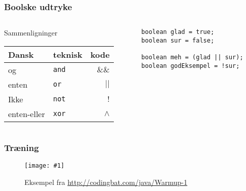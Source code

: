\documentclass{beamer}
\newcommand{\FIG}[2]{
\begin{figure}[]
  \centering
  \texttt{[image: \#1]}
  \caption{#2}
  \label{fig:#1}
\end{figure}
}
\begin{document}
\begin{frame}[fragile]
  \frametitle{Boolske udtryke}
  \begin{columns}
    \begin{column}{0.5\textwidth}
      \begin{block}{Sammenligninger}
          \begin{table}[h]
            \centering
            \begin{tabular}{llr}
              Dansk & teknisk & kode \\
              \hline
              og & \texttt{and} & $\&\&$ \\
              enten & \texttt{or} & $|| $\\
              Ikke & \texttt{not} & $!$\\
              enten-eller & \texttt{xor} & $\wedge$\\
            \end{tabular}
          \end{table}
      \end{block}
    \end{column}
    \begin{column}{0.5\textwidth}
\begin{verbatim} 
boolean glad = true;
boolean sur = false;

boolean meh = (glad || sur);
boolean godEksempel = !sur;

\end{verbatim}
    \end{column}
  \end{columns}
\end{frame}



\begin{frame}
  \frametitle{Træning}

\FIG{codingbat}{Eksempel fra \url{http://codingbat.com/java/Warmup-1}}

\end{frame}
\end{document}
